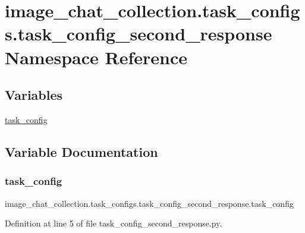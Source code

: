 \hypertarget{namespaceimage__chat__collection_1_1task__configs_1_1task__config__second__response}{}\section{image\+\_\+chat\+\_\+collection.\+task\+\_\+configs.\+task\+\_\+config\+\_\+second\+\_\+response Namespace Reference}
\label{namespaceimage__chat__collection_1_1task__configs_1_1task__config__second__response}
\subsection*{Variables}
\begin{DoxyCompactItemize}
\item 
\hyperlink{namespaceimage__chat__collection_1_1task__configs_1_1task__config__second__response_a9fa63c051f2737183d0aaae448b401c0}{task\+\_\+config}
\end{DoxyCompactItemize}


\subsection{Variable Documentation}
\mbox{\label{namespaceimage__chat__collection_1_1task__configs_1_1task__config__second__response_a9fa63c051f2737183d0aaae448b401c0}} 
\subsubsection{\texorpdfstring{task\+\_\+config}{task\_config}}
{\footnotesize\ttfamily image\+\_\+chat\+\_\+collection.\+task\+\_\+configs.\+task\+\_\+config\+\_\+second\+\_\+response.\+task\+\_\+config}



Definition at line 5 of file task\+\_\+config\+\_\+second\+\_\+response.\+py.

